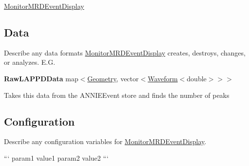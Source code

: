 \hyperlink{classMonitorMRDEventDisplay}{Monitor\-M\-R\-D\-Event\-Display}

\subsection*{Data}

Describe any data formats \hyperlink{classMonitorMRDEventDisplay}{Monitor\-M\-R\-D\-Event\-Display} creates, destroys, changes, or analyzes. E.\-G.

{\bfseries Raw\-L\-A\-P\-P\-D\-Data} {\ttfamily map$<$\hyperlink{classGeometry}{Geometry}, vector$<$\hyperlink{classWaveform}{Waveform}$<$double$>$$>$$>$}
\begin{DoxyItemize}
\item Takes this data from the {\ttfamily A\-N\-N\-I\-E\-Event} store and finds the number of peaks
\end{DoxyItemize}

\subsection*{Configuration}

Describe any configuration variables for \hyperlink{classMonitorMRDEventDisplay}{Monitor\-M\-R\-D\-Event\-Display}.

``` param1 value1 param2 value2 ``` 